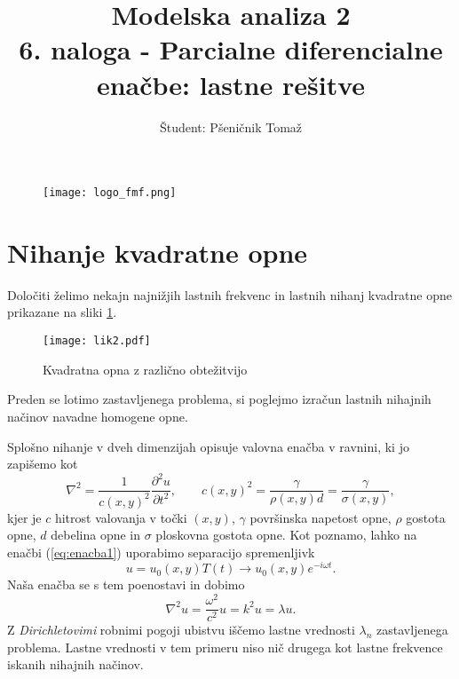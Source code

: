 \documentclass[12pt,a4paper]{article}
\title{\textbf{Modelska analiza 2} \\ 6. naloga - Parcialne diferencialne enačbe: lastne rešitve \\}
\author{Študent: Pšeničnik Tomaž}
\begin{document}

	\begin{figure} [h]
  \centering
  \texttt{[image: logo\_fmf.png]}
  \maketitle
\end{figure}
	
	
	
	\newpage
	
	
	
\section*{Nihanje kvadratne opne}

Določiti želimo nekajn najnižjih lastnih frekvenc in lastnih nihanj kvadratne opne prikazane na sliki \ref{fig:slika1}.

\begin{figure}[H]
\begin{center}
\texttt{[image: lik2.pdf]}
\caption{Kvadratna opna z različno obtežitvijo} \label{fig:slika1}
\end{center}
\end{figure} 

\noindent Preden se lotimo zastavljenega problema, si poglejmo izračun lastnih nihajnih načinov navadne homogene opne.

Splošno nihanje v dveh dimenzijah opisuje valovna enačba v ravnini, ki jo zapišemo kot
\begin{equation} \label{eq:enacba1}
\nabla ^{2} = \frac{1}{c(x,y)^{2}} \frac{\partial ^{2} u}{\partial t^{2}}, \qquad c(x,y)^{2}= \frac{\gamma}{\rho(x,y) d} = \frac{\gamma}{\sigma (x,y)},
\end{equation}
kjer je $c$ hitrost valovanja v točki $(x,y)$, $\gamma$ površinska napetost opne, $\rho$ gostota opne, $d$ debelina opne in $\sigma$ ploskovna gostota opne. Kot poznamo, lahko na enačbi (\ref{eq:enacba1}) uporabimo separacijo spremenljivk
\begin{equation*}
u=u_0(x,y)T(t) \rightarrow u_0(x,y) e^{-i\omega t}.
\end{equation*}
Naša enačba se s tem poenostavi in dobimo
\begin{equation} \label{eq:enacba2}
\nabla ^{2} u = \frac{ \omega ^{2}}{c^{2}} u = k^{2} u = \lambda u. 
\end{equation}
Z \textit{Dirichletovimi} robnimi pogoji ubistvu iščemo lastne vrednosti $\lambda _n$ zastavljenega problema. Lastne vrednosti v tem primeru niso nič drugega kot lastne frekvence iskanih nihajnih načinov.
\end{document}
